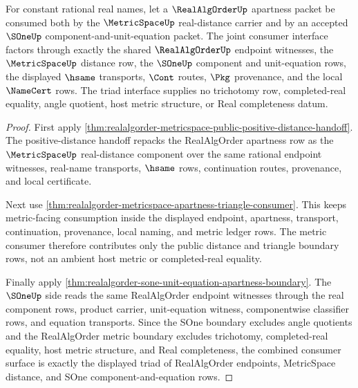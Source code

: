 \begin{theorem}
\label{thm:realalgorder-metric-sone-public-interface-triad}
For constant rational real names, let a $\RealAlgOrderUp$ apartness packet be
consumed both by the $\MetricSpaceUp$ real-distance carrier and by an accepted
$\SOneUp$ component-and-unit-equation packet. The joint consumer interface
factors through exactly the shared $\RealAlgOrderUp$ endpoint witnesses, the
$\MetricSpaceUp$ distance row, the $\SOneUp$ component and unit-equation rows,
the displayed $\hsame$ transports, $\Cont$ routes, $\Pkg$ provenance, and the
local $\NameCert$ rows. The triad interface supplies no trichotomy row,
completed-real equality, angle quotient, host metric structure, or Real
completeness datum.
\end{theorem}
\begin{proof}
First apply
\autoref{thm:realalgorder-metricspace-public-positive-distance-handoff}. The
positive-distance handoff repacks the RealAlgOrder apartness row as the
$\MetricSpaceUp$ real-distance component over the same rational endpoint
witnesses, real-name transports, $\hsame$ rows, continuation routes,
provenance, and local certificate.

Next use
\autoref{thm:realalgorder-metricspace-apartness-triangle-consumer}. This keeps
metric-facing consumption inside the displayed endpoint, apartness, transport,
continuation, provenance, local naming, and metric ledger rows. The metric
consumer therefore contributes only the public distance and triangle boundary
rows, not an ambient host metric or completed-real equality.

Finally apply
\autoref{thm:realalgorder-sone-unit-equation-apartness-boundary}. The
$\SOneUp$ side reads the same RealAlgOrder endpoint witnesses through the real
component rows, product carrier, unit-equation witness, componentwise
classifier rows, and equation transports. Since the SOne boundary excludes
angle quotients and the RealAlgOrder metric boundary excludes trichotomy,
completed-real equality, host metric structure, and Real completeness, the
combined consumer surface is exactly the displayed triad of RealAlgOrder
endpoints, MetricSpace distance, and SOne component-and-equation rows.
\end{proof}

